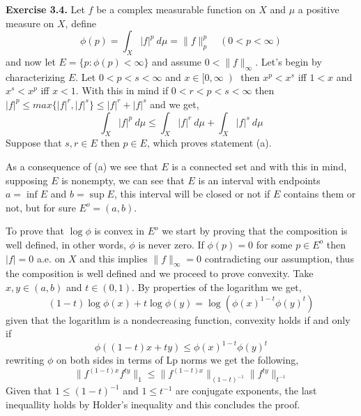 \documentclass{article}
\begin{document}
\bigbreak

\begin{exercise}\textbf{Exercise 3.4.}
    Let $f$ be a complex measurable function on $X$ and $\mu$ a positive measure on $X$, define
    \[
        \phi \left( p \right) = \int_X |f|^p\: d\mu = \|f\|_p^p \quad \left( 0 < p < \infty \right) 
    \]
    and now let $E = \{p: \phi \left( p \right) < \infty\}$ and assume $0 < \|f\|_\infty$. Let's begin by characterizing $E$. Let $0<p<s<\infty$ and $x \in [0, \infty \left)$ then $x^p < x^s$ iff $1 < x$ and $x^s < x^p$ iff $x < 1$. With this in mind if $0<r<p<s<\infty$ then $|f|^p \le max\{|f|^r,|f|^s\} \le |f|^r+|f|^s$ and we get,
    \[
        \int_X |f|^p\: d\mu \le \int_X |f|^r\: d\mu + \int_X |f|^s\: d\mu 
    \]
    Suppose that $s,r \in E$ then $p \in E$, which proves statement (a).

\bigbreak

    As a consequence of (a) we see that $E$ is a connected set and with this in mind, supposing $E$ is nonempty, we can see that $E$ is an interval with endpoints $a= \inf E$ and $b = \sup E$, this interval will be closed or not if $E$ contains them or not, but for sure $E^o= \left( a,b \right) $.

\bigbreak

    To prove that $\log \phi$ is convex in $E^o$ we start by proving that the composition is well defined, in other words, $\phi$ is never zero. If $\phi \left( p \right) = 0$ for some $p \in E^o $ then $|f|=0$ a.e. on $X$ and this implies $\|f\|_\infty = 0$ contradicting our assumption, thus the composition is well defined and we proceed to prove convexity. Take $x,y \in \left( a,b \right) $ and $t \in \left( 0,1 \right) $. By properties of the logarithm we get,
    \[
        \left( 1-t \right) \log \phi \left( x \right) + t \log \phi \left( y \right) = \log \left( \phi \left( x\right)^{1-t} \phi \left( y \right)^t \right) 
    \]
    given that the logarithm is a nondecreasing function, convexity holds if and only if
    \[
        \phi \left( (1-t)x + ty \right) \le \phi \left( x \right)^{1-t} \phi \left( y \right)^t
    \]
    rewriting $\phi$ on both sides in terms of Lp norms we get the following,
    \[
        \|f^{ \left( 1-t \right) x} f^{ty}\|_1 \le \|f^{ \left( 1-t \right) x}\|_ {\left( 1-t \right)^{-1} } \|f^{ty}\|_{t^{-1}}   
    \]
    Given that $1 \le \left( 1-t \right)^{-1}$ and $1 \le  t^{-1} $ are conjugate exponents, the last inequallity holds by Holder's inequality and this concludes the proof.

\bigbreak


\end{exercise}
\end{document}
